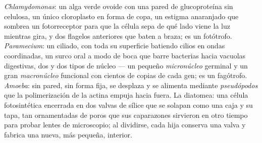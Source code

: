 \begin{example}\label{ex:b2:unicellular-diversity:four}
\emph{Chlamydomonas}: un alga verde ovoide con una pared de glucoproteína
sin celulosa, un único cloroplasto en forma de copa, un estigma
anaranjado que sombrea un fotorreceptor para que la célula sepa de qué
lado viene la luz mientras gira, y dos flagelos anteriores que baten a
braza; es un fotótrofo. \emph{Paramecium}: un ciliado, con toda su
superficie batiendo cilios en ondas coordinadas, un surco oral a modo de
boca que barre bacterias hacia vacuolas digestivas, dos  y dos tipos de núcleo --- un pequeño \emph{micronúcleo}
germinal y un gran \emph{macronúcleo} funcional con cientos de copias de
cada gen; es un fagótrofo. \emph{Amoeba}: sin pared, sin forma fija, se
desplaza y se alimenta mediante \emph{pseudópodos} que la polimerización
de la actina empuja hacia fuera. La diatomea: una célula fotosintética
encerrada en dos valvas de sílice que se solapan como una caja y su tapa,
tan ornamentadas de poros que sus caparazones sirvieron en otro tiempo
para probar lentes de microscopio; al dividirse, cada hija conserva una
valva y fabrica una nueva, más pequeña, interior.
\end{example}

